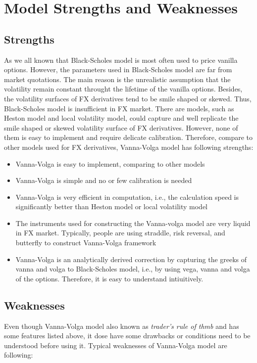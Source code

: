 \chapter{Model Strengths and Weaknesses}


\section{Strengths}

As we all known that Black-Scholes model is most often used to price vanilla options. However, the parameters used in Black-Scholes model are far from market quotations. The main reason is the unrealistic assumption that the volatility remain constant throught the lifetime of the vanilla options. Besides, the volatility surfaces of FX derivatives tend to be smile shaped or skewed. Thus, Black-Scholes model is insufficient in FX market.
\newline
\newline
There are models, such as Heston model and local volatility model, could capture and well replicate the smile shaped or skewed volatility surface of FX derivatives. However, none of them is easy to implement and require delicate calibration. Therefore, compare to other models used for FX derivatives, Vanna-Volga model has following strengths:

\begin{itemize}
	\item Vanna-Volga is easy to implement, comparing to other models
	\item Vanna-Volga is simple and no or few calibration is needed
	\item Vanna-Volga is very efficient in computation, i.e., the calculation speed is significantly better than Heston model or local volatility model
	\item The instruments used for constructing the Vanna-volga model are very liquid in FX market. Typically, people are using straddle, risk reversal, and butterfly to construct Vanna-Volga framework
	\item Vanna-Volga is an analytically derived correction by capturing the greeks of vanna and volga to Black-Scholes model, i.e., by using vega, vanna and volga of the options. Therefore, it is easy to understand intiuitively.
\end{itemize}


\section{Weaknesses}
Even though Vanna-Volga model also known as \textit{trader's rule of thmb} and has some features listed above, it dose have some drawbacks or conditions need to be understood before using it. Typical weaknesses of Vanna-Volga model are following:

